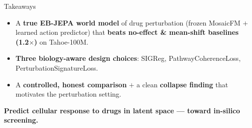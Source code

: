 \documentclass[aspectratio=169]{beamer}
\newcommand{\hl}[1]{\textcolor{accent}{\textbf{#1}}}
\newcommand{\hk}[1]{\textcolor{accent2}{\textbf{#1}}}
\begin{document}
\begin{frame}{Takeaways}
\vspace{8pt}
\begin{itemize}\setlength\itemsep{8pt}
  \item A \hl{true EB-JEPA world model} of drug perturbation (frozen MosaicFM $+$ learned action predictor) that \hk{beats no-effect \& mean-shift baselines (1.2$\times$)} on Tahoe-100M.
  \item \hl{Three biology-aware design choices}: SIGReg, PathwayCoherenceLoss, PerturbationSignatureLoss.
  \item A \hl{controlled, honest comparison} $+$ a clean \hk{collapse finding} that motivates the perturbation setting.
\end{itemize}
\vspace{14pt}
\centering{\color{accent}\rule{4cm}{1.2pt}}\par\vspace{6pt}
{\large\color{ink}\textbf{Predict cellular response to drugs in latent space --- toward in-silico screening.}}
\end{frame}
\end{document}
